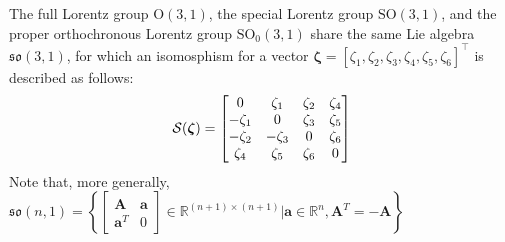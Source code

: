 \begin{example}
    The full Lorentz group $\text{O}(3, 1)$, the special Lorentz group $\text{SO}(3, 1)$, and the proper orthochronous Lorentz group $\text{SO}_0(3, 1)$ share the same Lie algebra $\mathfrak{so}(3, 1)$, for which an isomosphism for a vector $\boldsymbol{\zeta} = [\zeta_1, \zeta_2, \zeta_3, \zeta_4, \zeta_5, \zeta_6]^\top$ is described as follows:
    \begin{align}
        \SL[\boldsymbol{\zeta}] = \begin{bmatrix}
            0 & \zeta_1 & \zeta_2 & \zeta_4 \\
            -\zeta_1 & 0 & \zeta_3 & \zeta_5 \\
            -\zeta_2 & -\zeta_3 & 0 & \zeta_6 \\
            \zeta_4 & \zeta_5 & \zeta_6 & 0
        \end{bmatrix}
    \end{align}
    Note that, more generally, $\mathfrak{so}(n, 1) = \left\{\begin{bmatrix} \mathbf{A} & \mathbf{a}\\
              \mathbf{a}^T & 0 \end{bmatrix} \in \mathbb{R}^{(n+1) \times (n+1)}| \mathbf{a}\in\mathbb{R}^n, \mathbf{A}^T=-\mathbf{A}\right\}$
\end{example}
